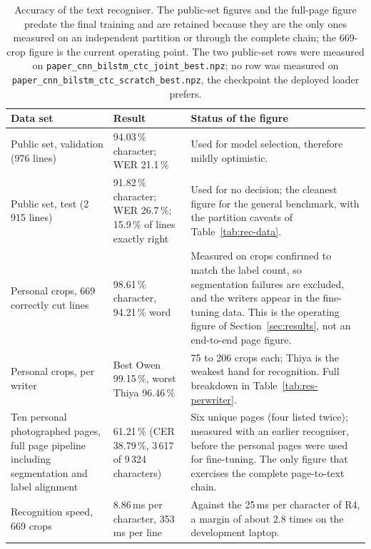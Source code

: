 \begin{table}[h]
\centering
\fontsize{8.5}{10.2}\selectfont
\setlength{\tabcolsep}{4pt}
\begin{tabularx}{\linewidth}{|p{3.1cm}|p{2.7cm}|X|}
\hline
\textbf{Data set} & \textbf{Result} & \textbf{Status of the figure} \\
\hline
Public set, validation (976 lines) & 94.03\,\% character; WER 21.1\,\% & Used for model selection, therefore mildly optimistic. \\
\hline
Public set, test (2\,915 lines) & 91.82\,\% character; WER 26.7\,\%; 15.9\,\% of lines exactly right & Used for no decision; the cleanest figure for the general benchmark, with the partition caveats of Table~\ref{tab:rec-data}. \\
\hline
Personal crops, 669 correctly cut lines & 98.61\,\% character, 94.21\,\% word & Measured on crops confirmed to match the label count, so segmentation failures are excluded, and the writers appear in the fine-tuning data. This is the operating figure of Section~\ref{sec:results}, not an end-to-end page figure. \\
\hline
Personal crops, per writer & Best Owen 99.15\,\%, worst Thiya 96.46\,\% & 75 to 206 crops each; Thiya is the weakest hand for recognition. Full breakdown in Table~\ref{tab:res-perwriter}. \\
\hline
Ten personal photographed pages, full page pipeline including segmentation and label alignment & 61.21\,\% (CER 38.79\,\%, 3\,617 of 9\,324 characters) & Six unique pages (four listed twice); measured with an earlier recogniser, before the personal pages were used for fine-tuning. The only figure that exercises the complete page-to-text chain. \\
\hline
Recognition speed, 669 crops & 8.86\,ms per character, 353\,ms per line & Against the 25\,ms per character of R4, a margin of about 2.8 times on the development laptop. \\
\hline
\end{tabularx}
\caption{Accuracy of the text recogniser. The public-set figures and the full-page figure predate the final training and are retained because they are the only ones measured on an independent partition or through the complete chain; the 669-crop figure is the current operating point. The two public-set rows were measured on \texttt{paper\_cnn\_bilstm\_ctc\_joint\_best.npz}; no row was measured on \texttt{paper\_cnn\_bilstm\_ctc\_scratch\_best.npz}, the checkpoint the deployed loader prefers.}
\label{tab:rec-results}
\end{table}

